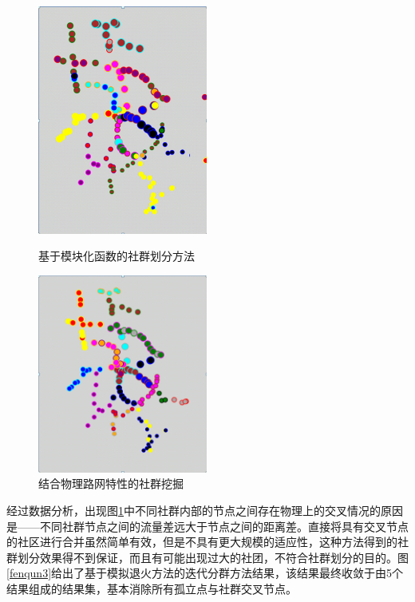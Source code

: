 				\begin{figure}
				\begin{minipage}{0.5\linewidth}
					\centering
					\includegraphics[width=2.2in]{picture/liuliangbianquan}
					\caption{基于模块化函数的社群划分方法}
					\label{fenqun1}
				\end{minipage}%
				\begin{minipage}{0.5\linewidth}
					\centering
					\includegraphics[width=2.2in]{picture/xiaochuguli}
					\caption{结合物理路网特性的社群挖掘}
					\label{fenqun2}
				\end{minipage}
				\end{figure}

		经过数据分析，出现图\ref{fenqun2}中不同社群内部的节点之间存在物理上的交叉情况的原因是——不同社群节点之间的流量差远大于节点之间的距离差。直接将具有交叉节点的社区进行合并虽然简单有效，但是不具有更大规模的适应性，这种方法得到的社群划分效果得不到保证，而且有可能出现过大的社团，不符合社群划分的目的。图\ref{fenqun3}给出了基于模拟退火方法的迭代分群方法结果，该结果最终收敛于由5个结果组成的结果集，基本消除所有孤立点与社群交叉节点。



